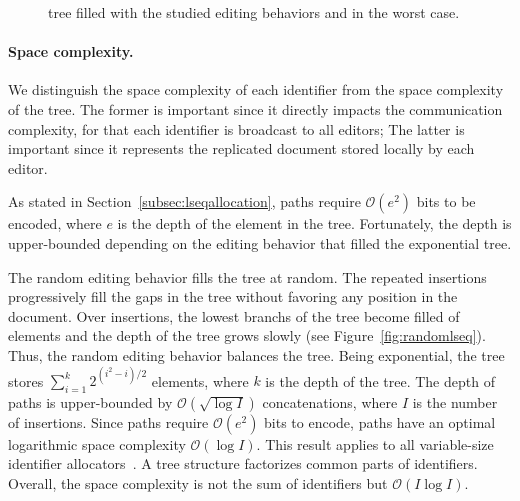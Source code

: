 \begin{figure}
  \centering
  \hspace{5pt}
  \hspace{5pt}
  \caption{\label{fig:complexity} \LSEQ tree filled with the studied editing
    behaviors and in the worst case.}
\end{figure}

\paragraph{Space complexity.}

We distinguish the space complexity of each identifier from the space complexity
of the tree. The former is important since it directly impacts the communication
complexity, for that each identifier is broadcast to all editors; The latter is
important since it represents the replicated document stored locally by each
editor.

As stated in Section~\ref{subsec:lseqallocation}, paths
require $\mathcal{O}(e^2)$ bits to be encoded,
where $e$ is the depth of the element in the tree. Fortunately, the depth is
upper-bounded depending on the editing behavior that filled the exponential
tree.

The random editing behavior fills the tree at random. The repeated insertions
progressively fill the gaps in the tree without favoring any position in the
document. Over insertions, the lowest branchs of the tree become filled of
elements and the depth of the tree grows slowly (see
Figure~\ref{fig:randomlseq}). Thus, the random editing behavior balances the
tree. Being exponential, the tree stores
$\textstyle\sum\nolimits_{i=1}^{k}{2^{(i^2-i)/2}}$ elements, where $k$ is the
depth of the tree. The depth of paths is upper-bounded by
$\mathcal{O}(\sqrt{\log I})$ concatenations, where $I$ is the number of
insertions. Since paths require $\mathcal{O}(e^2)$ bits to encode, paths have an
optimal logarithmic space complexity $\mathcal{O}(\log I)$. This result applies
to all variable-size identifier allocators~\cite{preguica2009commutative,
  weiss2009logoot}. A tree structure factorizes common parts of
identifiers. Overall, the space complexity is not the sum of identifiers but
$\mathcal{O}(I\log I)$.

